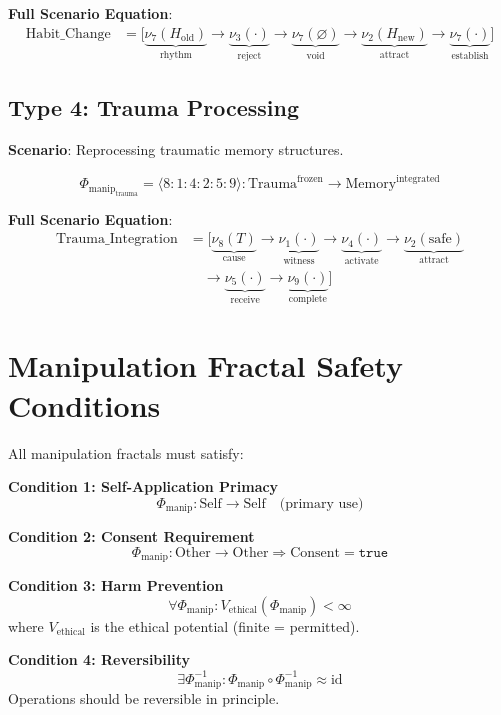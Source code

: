 \documentclass[11pt,twoside]{book}
\newcommand{\noe}[1]{\nu_{#1}}
\newcommand{\ManipFrac}{\Phi_{\mathrm{manip}}}
\begin{document}
\textbf{Full Scenario Equation}:
\begin{align}
    \text{Habit\_Change} &= \biggl[
    \underbrace{\noe{7}(H_{\mathrm{old}})}_{\scriptscriptstyle\text{rhythm}}
    \to \underbrace{\noe{3}(\cdot)}_{\scriptscriptstyle\text{reject}}
    \to \underbrace{\noe{7}(\varnothing)}_{\scriptscriptstyle\text{void}}
    \to \underbrace{\noe{2}(H_{\mathrm{new}})}_{\scriptscriptstyle\text{attract}}
    \to \underbrace{\noe{7}(\cdot)}_{\scriptscriptstyle\text{establish}}
    \biggr]
\end{align}

\subsection{Type 4: Trauma Processing}

\textbf{Scenario}: Reprocessing traumatic memory structures.

\begin{equation}
\boxed{
    \ManipFrac_{\mathrm{trauma}} = \langle 8 : 1 : 4 : 2 : 5 : 9 \rangle
    : \mathrm{Trauma}^{\mathrm{frozen}} \to \mathrm{Memory}^{\mathrm{integrated}}
}
\end{equation}

\textbf{Full Scenario Equation}:
\begin{align}
    \text{Trauma\_Integration} &= \biggl[
    \underbrace{\noe{8}(T)}_{\scriptscriptstyle\text{cause}}
    \to \underbrace{\noe{1}(\cdot)}_{\scriptscriptstyle\text{witness}}
    \to \underbrace{\noe{4}(\cdot)}_{\scriptscriptstyle\text{activate}}
    \to \underbrace{\noe{2}(\mathrm{safe})}_{\scriptscriptstyle\text{attract}} \nonumber \\
    &\quad \to \underbrace{\noe{5}(\cdot)}_{\scriptscriptstyle\text{receive}}
    \to \underbrace{\noe{9}(\cdot)}_{\scriptscriptstyle\text{complete}}
    \biggr]
\end{align}

\section{Manipulation Fractal Safety Conditions}

\begin{tcolorbox}[colback=red!5!white,colframe=red!75!black,title=\textbf{Ethical Boundary Conditions},breakable]
All manipulation fractals must satisfy:

\textbf{Condition 1: Self-Application Primacy}
\[
    \ManipFrac : \mathrm{Self} \to \mathrm{Self} \quad \text{(primary use)}
\]

\textbf{Condition 2: Consent Requirement}
\[
    \ManipFrac : \mathrm{Other} \to \mathrm{Other} \Rightarrow \mathrm{Consent} = \mathtt{true}
\]

\textbf{Condition 3: Harm Prevention}
\[
    \forall \ManipFrac : V_{\mathrm{ethical}}(\ManipFrac) < \infty
\]
where $V_{\mathrm{ethical}}$ is the ethical potential (finite = permitted).

\textbf{Condition 4: Reversibility}
\[
    \exists \ManipFrac^{-1} : \ManipFrac \circ \ManipFrac^{-1} \approx \mathrm{id}
\]
Operations should be reversible in principle.
\end{tcolorbox}
\end{document}
